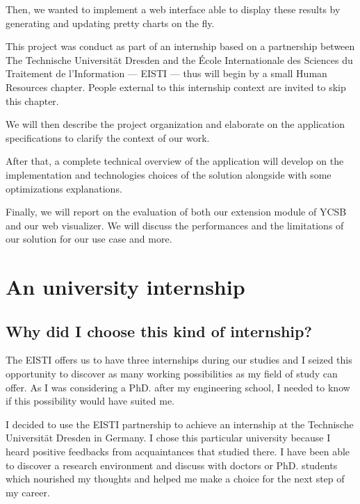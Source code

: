 \documentclass[a4paper,11pt]{report}
\begin{document}
Then, we wanted to implement a web interface able to display these results by generating and updating pretty charts on the fly.

\bigskip

This project was conduct as part of an internship based on a partnership between The Technische Universität Dresden and the École Internationale des Sciences du Traitement de l'Information --- EISTI --- thus will begin by a small Human Resources chapter. People external to this internship context are invited to skip this chapter.

We will then describe the project organization and elaborate on the application specifications to clarify the context of our work.

After that, a complete technical overview of the application will develop on  the implementation and technologies choices of the solution alongside with some optimizations explanations.

Finally, we will report on the evaluation of both our extension module of YCSB and our web visualizer. We will discuss the performances and the limitations of our solution for our use case and more.

\newpage

\chapter{An university internship}\label{partnership}

\section{Why did I choose this kind of internship?}

The EISTI offers us to have three internships during our studies and I seized this opportunity to discover as many working possibilities as my field of study can offer. As I was considering a PhD. after my engineering school, I needed to know if this possibility would have suited me.

\bigskip

I decided to use the EISTI partnership to achieve an internship at the Technische Universität Dresden in Germany. I chose this particular university because I heard positive feedbacks from acquaintances that studied there. I have been able to discover a research environment and discuss with doctors or PhD. students which nourished my thoughts and helped me make a choice for the next step of my career.
\end{document}
